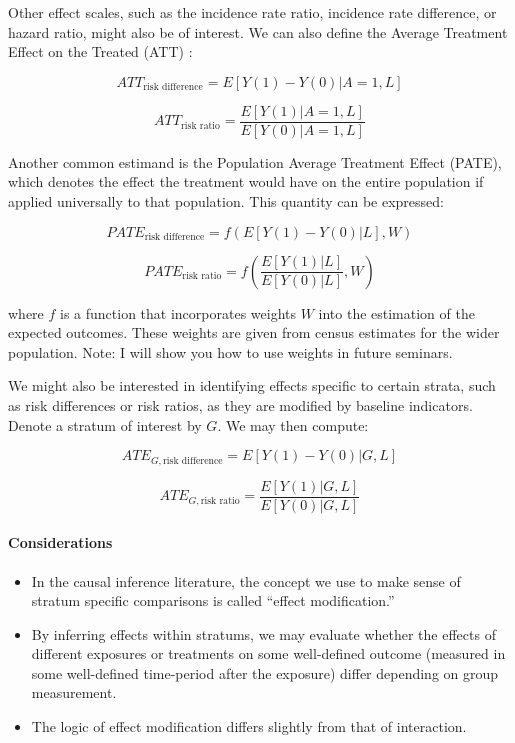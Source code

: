 \documentclass[
  singlecolumn]{article}
\let\oldparagraph\paragraph
\renewcommand{\paragraph}[1]{\oldparagraph{#1}\mbox{}}
\providecommand{\tightlist}{%
  \setlength{\itemsep}{0pt}\setlength{\parskip}{0pt}}\usepackage{longtable,booktabs,array}
\begin{document}
Other effect scales, such as the incidence rate ratio, incidence rate
difference, or hazard ratio, might also be of interest. We can also
define the Average Treatment Effect on the Treated (ATT) :

\[ATT_{\text{risk difference}} = E[Y(1) - Y(0)|A=1,L]\]

\[ATT_{\text{risk ratio}} = \frac{E[Y(1)|A=1,L]}{E[Y(0)|A=1, L]}\]

Another common estimand is the Population Average Treatment Effect
(PATE), which denotes the effect the treatment would have on the entire
population if applied universally to that population. This quantity can
be expressed:

\[PATE_{\text{risk difference}} = f(E[Y(1) - Y(0)|L], W)\]

\[PATE_{\text{risk ratio}} = f\left(\frac{E[Y(1)|L]}{E[Y(0)|L]}, W\right)\]

where \(f\) is a function that incorporates weights \(W\) into the
estimation of the expected outcomes. These weights are given from census
estimates for the wider population. Note: I will show you how to use
weights in future seminars.

We might also be interested in identifying effects specific to certain
strata, such as risk differences or risk ratios, as they are modified by
baseline indicators. Denote a stratum of interest by \(G\). We may then
compute:

\[ATE_{G,\text{risk difference}} = E[Y(1) - Y(0)|G, L]\]

\[ATE_{G,\text{risk ratio}} = \frac{E[Y(1)|G, L]}{E[Y(0)|G, L]}\]

\hypertarget{considerations}{%
\paragraph{Considerations}\label{considerations}}

\begin{itemize}
\tightlist
\item
  In the causal inference literature, the concept we use to make sense
  of stratum specific comparisons is called ``effect modification.''
\item
  By inferring effects within stratums, we may evaluate whether the
  effects of different exposures or treatments on some well-defined
  outcome (measured in some well-defined time-period after the exposure)
  differ depending on group measurement.
\item
  The logic of effect modification differs slightly from that of
  interaction.
\end{itemize}
\end{document}
